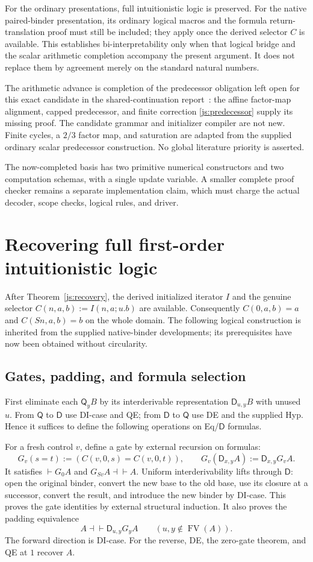 \documentclass[11pt,letterpaper]{article}
\theoremstyle{definition}\newtheorem{definition}[theorem]{Definition}
\theoremstyle{remark}\newtheorem{remark}[theorem]{Remark}
\newcommand{\D}{\mathsf D}
\newcommand{\Q}{\mathsf Q}
\newcommand{\FV}{\operatorname{FV}}
\begin{document}
For the ordinary presentations, full intuitionistic logic is preserved.
For the native paired-binder presentation, its ordinary logical macros
and the formula return-translation proof must still be included; they
apply once the derived selector $C$ is available.  This establishes
bi-interpretability only when that logical bridge and the scalar
arithmetic completion accompany the present argument.  It does not
replace them by agreement merely on the standard natural numbers.

The arithmetic advance is completion of the predecessor obligation
left open for this exact candidate in the shared-continuation
report~\cite{shared}: the affine factor-map alignment, capped
predecessor, and finite correction \eqref{js:predecessor} supply its
missing proof.  The candidate grammar and initializer compiler are not
new.  Finite cycles, a $2/3$ factor map, and saturation are adapted from
the supplied ordinary scalar predecessor construction.  No global
literature priority is asserted.

The now-completed basis has two primitive numerical constructors and
two computation schemas, with a single update variable.  A smaller
complete proof checker remains a separate implementation claim, which
must charge the actual decoder, scope checks, logical rules, and driver.


\section{Recovering full first-order intuitionistic logic}
\label{sec:choice-introduction}
After Theorem~\ref{js:recovery}, the derived initialized iterator $I$ and
the genuine selector $C(n,a,b):=I(n,a;u.b)$ are available. Consequently
$C(0,a,b)=a$ and $C(Sn,a,b)=b$ on the whole domain. The following
logical construction is inherited from the supplied native-binder
developments\cite{generated,elimination}; its prerequisites have now
been obtained without circularity.

\subsection{Gates, padding, and formula selection}
First eliminate each $\Q_yB$ by its interderivable representation
$\D_{u,y}B$ with unused $u$. From $\Q$ to $\D$ use DI-case and QE;
from $\D$ to $\Q$ use DE and the supplied Hyp. Hence it suffices to
define the following operations on Eq/$\D$ formulas.

For a fresh control $v$, define a gate by external recursion on formulas:
\[
 G_v(s=t):=(C(v,0,s)=C(v,0,t)),\qquad
 G_v(\D_{x,y}A):=\D_{x,y}G_vA.
\]
It satisfies $\vdash G_0A$ and $G_{Sv}A\dashv\vdash A$.
Uniform interderivability lifts through $\D$: open the original binder,
convert the new base to the old base, use its closure at a successor,
convert the result, and introduce the new binder by DI-case.
This proves the gate identities by external structural induction.
It also proves the padding equivalence
\[
 A\dashv\vdash\D_{u,y}G_yA\qquad(u,y\notin\FV(A)).
\]
The forward direction is DI-case. For the reverse, DE, the zero-gate
theorem, and QE at $1$ recover $A$.
\end{document}
